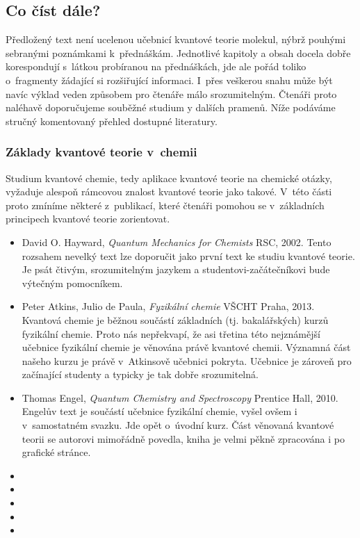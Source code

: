 \subsection*{Co číst dále?}
Předložený text není ucelenou učebnicí kvantové teorie molekul, nýbrž pouhými sebranými poznámkami k~přednáškám. Jednotlivé kapitoly a obsah docela dobře korespondují s~látkou probíranou na přednáškách, jde ale pořád toliko o~fragmenty žádající si rozšiřující informaci. I~přes veškerou snahu může být navíc výklad veden způsobem pro čtenáře málo srozumitelným. Čtenáři proto naléhavě doporučujeme souběžné studium y dalších pramenů. Níže podáváme stručný komentovaný přehled dostupné literatury.

   	
\subsubsection*{Základy kvantové teorie v~chemii}

Studium kvantové chemie, tedy aplikace kvantové teorie na chemické otázky, vyžaduje alespoň rámcovou znalost kvantové teorie jako takové. V~této části proto zmíníme některé z~publikací, které čtenáři pomohou se v~základních principech kvantové teorie zorientovat.

\begin{itemize}

\item David O. Hayward, \textit{Quantum Mechanics for Chemists} RSC, 2002. Tento rozsahem nevelký text lze doporučit jako první text ke studiu kvantové teorie. Je psát čtivým, srozumitelným jazykem a studentovi-začátečníkovi bude výtečným pomocníkem.   
\item Peter Atkins, Julio de Paula, \textit{Fyzikální chemie} VŠCHT Praha, 2013. Kvantová chemie je běžnou součástí základních (tj. bakalářských) kurzů fyzikální chemie. Proto nás nepřekvapí, že asi třetina této nejznámější učebnice fyzikální chemie je věnována právě kvantové chemii. Významná část našeho kurzu je právě v~Atkinsově učebnici pokryta. Učebnice je zároveň pro začínající studenty a typicky je tak dobře srozumitelná.
\item Thomas Engel, \textit{Quantum Chemistry and Spectroscopy} Prentice Hall, 2010. Engelův text je součástí učebnice fyzikální chemie, vyšel ovšem i v~samostatném svazku. Jde opět o~úvodní kurz. Část věnovaná kvantové teorii se autorovi mimořádně povedla, kniha je velmi pěkně zpracována i po grafické stránce. 
\item
\item
\item
\item
\item


\end{itemize}


